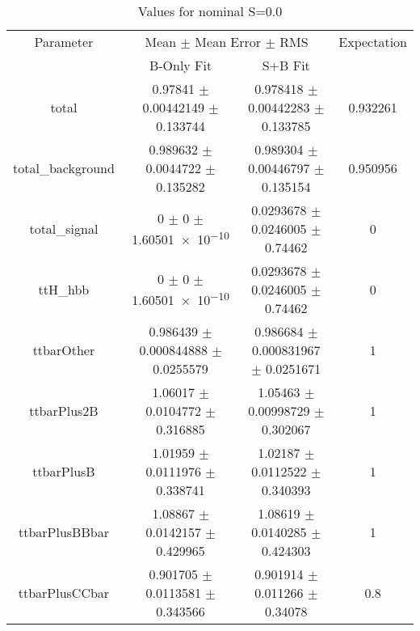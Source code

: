 \begin{table}
\centering
\caption{Values for nominal S=0.0}
\begin{tabular}{cccc}
\toprule
Parameter & \multicolumn{2}{c}{Mean $\pm$ Mean Error $\pm$ RMS} & Expectation\\
 & B-Only Fit & S+B Fit & \\
\midrule
total & \num{0.97841} $\pm$ \num{0.00442149} $\pm$ \num{0.133744} & \num{0.978418} $\pm$ \num{0.00442283} $\pm$ \num{0.133785} & \num{0.932261}\\
total\_background & \num{0.989632} $\pm$ \num{0.0044722} $\pm$ \num{0.135282} & \num{0.989304} $\pm$ \num{0.00446797} $\pm$ \num{0.135154} & \num{0.950956}\\
total\_signal & \num{0} $\pm$ \num{0} $\pm$ \num{1.60501e-10} & \num{0.0293678} $\pm$ \num{0.0246005} $\pm$ \num{0.74462} & \num{0}\\
ttH\_hbb & \num{0} $\pm$ \num{0} $\pm$ \num{1.60501e-10} & \num{0.0293678} $\pm$ \num{0.0246005} $\pm$ \num{0.74462} & \num{0}\\
ttbarOther & \num{0.986439} $\pm$ \num{0.000844888} $\pm$ \num{0.0255579} & \num{0.986684} $\pm$ \num{0.000831967} $\pm$ \num{0.0251671} & \num{1}\\
ttbarPlus2B & \num{1.06017} $\pm$ \num{0.0104772} $\pm$ \num{0.316885} & \num{1.05463} $\pm$ \num{0.00998729} $\pm$ \num{0.302067} & \num{1}\\
ttbarPlusB & \num{1.01959} $\pm$ \num{0.0111976} $\pm$ \num{0.338741} & \num{1.02187} $\pm$ \num{0.0112522} $\pm$ \num{0.340393} & \num{1}\\
ttbarPlusBBbar & \num{1.08867} $\pm$ \num{0.0142157} $\pm$ \num{0.429965} & \num{1.08619} $\pm$ \num{0.0140285} $\pm$ \num{0.424303} & \num{1}\\
ttbarPlusCCbar & \num{0.901705} $\pm$ \num{0.0113581} $\pm$ \num{0.343566} & \num{0.901914} $\pm$ \num{0.011266} $\pm$ \num{0.34078} & \num{0.8}\\
\bottomrule
\end{tabular}
\end{table}